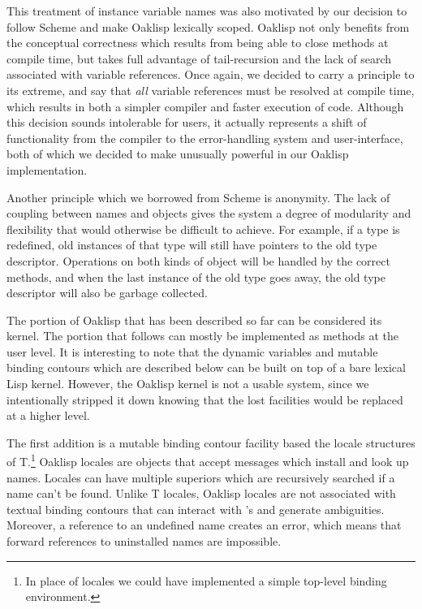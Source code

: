 This treatment of instance variable names was also motivated by our
decision to follow Scheme and make Oaklisp lexically scoped.  Oaklisp
not only benefits from the conceptual correctness which results from
being able to close methods at compile time, but takes full advantage
of tail-recursion and the lack of search associated with variable
references.  Once again, we decided to carry a principle to its
extreme, and say that {\it all} variable references must be resolved
at compile time, which results in both a simpler compiler and faster
execution of code.  Although this decision sounds intolerable for
users, it actually represents a shift of functionality from the
compiler to the error-handling system and user-interface, both of
which we decided to make unusually powerful in our Oaklisp
implementation.

Another principle which we borrowed from Scheme is anonymity.  The
lack of coupling between names and objects gives the system a degree
of modularity and flexibility that would otherwise be difficult to
achieve.  For example, if a type is redefined, old instances of that
type will still have pointers to the old type descriptor.  Operations
on both kinds of object will be handled by the correct methods, and
when the last instance of the old type goes away, the old type
descriptor will also be garbage collected.

The portion of Oaklisp that has been described so far can be
considered its kernel.  The portion that follows can mostly be
implemented as methods at the user level.  It is interesting to note
that the dynamic variables and mutable binding contours which are
described below can be built on top of a bare lexical Lisp kernel.
However, the Oaklisp kernel is not a usable system, since we
intentionally stripped it down knowing that the lost facilities would
be replaced at a higher level.

The first addition is a mutable binding contour facility based the
locale structures of T.\footnote{In place of locales we could have
implemented a simple top-level binding environment.} Oaklisp locales
are objects that accept messages which install and look up names.
Locales can have multiple superiors which are recursively searched if
a name can't be found.  Unlike T locales, Oaklisp locales are not
associated with textual binding contours that can interact with
's and generate ambiguities.  Moreover, a reference to an
undefined name creates an error, which means that forward references
to uninstalled names are impossible.

